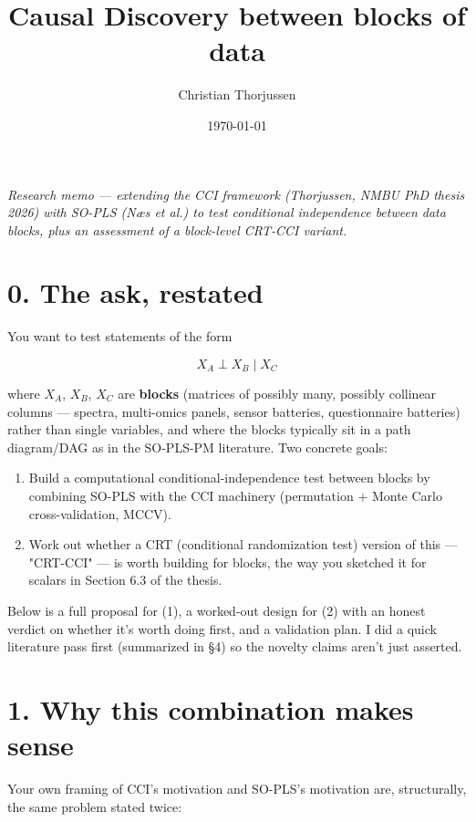 \documentclass[11pt,a4paper]{article}
\title{Causal Discovery between blocks of data}
\author{Christian Thorjussen}
\date{\today}
\begin{document}
	\maketitle
	
	
	\emph{Research memo — extending the CCI framework (Thorjussen, NMBU PhD thesis 2026) with SO-PLS (Næs et al.) to test conditional independence between data blocks, plus an assessment of a block-level CRT-CCI variant.}
	
	
	\section{0. The ask, restated}
	
	You want to test statements of the form
	
	\[
	X_A \perp X_B \mid X_C
	\]
	
	where \(X_A\), \(X_B\), \(X_C\) are \textbf{blocks} (matrices of possibly many, possibly collinear columns — spectra, multi-omics panels, sensor batteries, questionnaire batteries) rather than single variables, and where the blocks typically sit in a path diagram/DAG as in the SO-PLS-PM literature. Two concrete goals:
	
	\begin{enumerate}
		\item Build a computational conditional-independence test between blocks by combining SO-PLS with the CCI machinery (permutation + Monte Carlo cross-validation, MCCV).
		\item Work out whether a CRT (conditional randomization test) version of this — "CRT-CCI" — is worth building for blocks, the way you sketched it for scalars in Section 6.3 of the thesis.
		
	\end{enumerate}
	Below is a full proposal for (1), a worked-out design for (2) with an honest verdict on whether it's worth doing first, and a validation plan. I did a quick literature pass first (summarized in \S{}4) so the novelty claims aren't just asserted.
	
	
	\section{1. Why this combination makes sense}
	
	Your own framing of CCI's motivation and SO-PLS's motivation are, structurally, the same problem stated twice:
	
\end{document}
